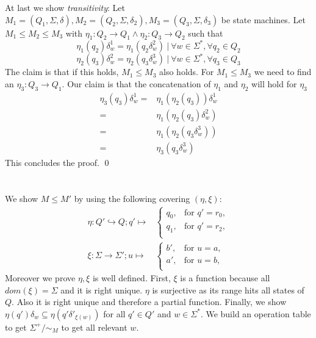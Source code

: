 \documentclass[a4paper,12pt,numbers=noenddot]{scrreport}
\begin{document}
At last we show \textit{transitivity}: Let $M_1 = (Q_1, \Sigma, \delta), M_2 = (Q_2, \Sigma, \delta_2), M_3 = (Q_3, \Sigma, \delta_3)$ be state machines. Let $M_1 \le M_2 \le M_3$ with $\eta_1 : Q_2 \rightarrow Q_1 \land \eta_2 : Q_3 \rightarrow Q_2$ such that 
\begin{equation}
    \eta_1(q_2)\delta^1_w = \eta_1(q_2\delta^2_w) ~|~ \forall w \in \Sigma^*, \forall q_2 \in Q_2 
\end{equation}
\begin{equation}
    \eta_2(q_3)\delta^2_w = \eta_2(q_3\delta^3_w) ~|~ \forall w \in \Sigma^*, \forall q_3 \in Q_3
\end{equation}
The claim is that if this holds, $M_1 \le M_3$ also holds. For $M_1 \le M_3$ we need to find an $\eta_3 : Q_3 \rightarrow Q_1$.
Our claim is that the concatenation of $\eta_1$ and $\eta_2$ will hold for $\eta_3$
\begin{align*}
    \eta_3 (q_3)\delta^1_w  = & \eta_1(\eta_2(q_3))\delta^1_w \\
                            = & \eta_1(\eta_2(q_3)\delta^2_w) \\
                            = & \eta_1(\eta_2(q_3\delta^3_w)) \\
                            = & \eta_3(q_3\delta^3_w)
\end{align*}
This concludes the proof.
\qed
\section{}
\section{}
We show $M \leq M'$ by using the following covering $(\eta, \xi)$:
\begin{align*}
    \eta: Q' \hookrightarrow Q; q' \mapsto &
        \begin{cases}
            q_0,      & \text{for } q' = r_0, \\
            q_1,      & \text{for } q' = r_2, \\
        \end{cases} \\
    \xi: \Sigma \rightarrow \Sigma'; u \mapsto &
        \begin{cases}
            b',      & \text{for } u = a, \\
            a',      & \text{for } u = b, \\
        \end{cases}
\end{align*}
Moreover we prove $\eta, \xi$ is well defined.
First, $\xi$ is a function because all $dom(\xi) = \Sigma$ and it is right unique.
$\eta$ is surjective as its range hits all states of $Q$.
Also it is right unique and therefore a partial function.
Finally, we show $\eta(q')\delta_w \subseteq \eta(q'\delta'_{\xi(w)})$ for all $q' \in Q'$ and $w \in \Sigma^*$.
We build an operation table to get $\Sigma^+ / \sim_M$ to get all relevant $w$.
\end{document}
